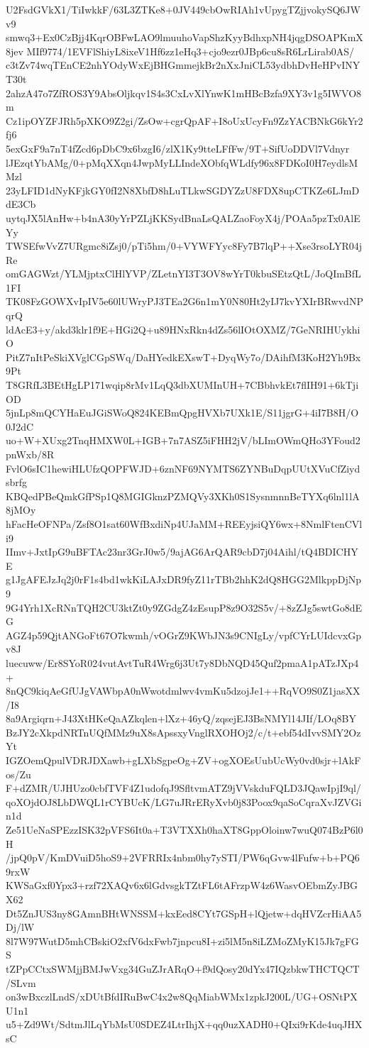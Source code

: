 U2FsdGVkX1/TiIwkkF/63L3ZTKe8+0JV449cbOwRIAh1vUpygTZjjvokySQ6JWv9
smwq3+Ex0CzBjj4KqrOBFwLAO9lmuuhoVapShzKyyBdhxpNH4jqgDSOAPKmX8jev
MIf9774/1EVFlShiyL8ixeV1Hf6zz1eHq3+cjo9ezr0JBp6cu8sR6LrLirab0AS/
c3tZv74wqTEnCE2nhYOdyWxEjBHGmmejkBr2nXxJniCL53ydbhDvHeHPvINYT30t
2ahzA47o7ZfROS3Y9AbsOljkqv1S4s3CxLvXlYnwK1mHBcBzfa9XY3v1g5IWVO8m
Cz1ipOYZFJRh5pXKO9Z2gi/ZsOw+cgrQpAF+I8oUxUcyFn9ZzYACBNkG6kYr2fj6
5exGxF9a7nT4fZcd6pDbC9x6bzgI6/zlX1Ky9tteLFfFw/9T+SifUoDDVl7Vdnyr
lJEzqtYbAMg/0+pMqXXqn4JwpMyLLIndeXObfqWLdfy96x8FDKoI0H7eydlsMMzl
23yLFID1dNyKFjkGY0fI2N8XbfD8hLuTLkwSGDYZzU8FDX8upCTKZe6LJmDdE3Cb
uytqJX5lAnHw+b4nA30yYrPZLjKKSydBnaLsQALZaoFoyX4j/POAa5pzTx0AlEYy
TWSEfwVvZ7URgmc8iZsj0/pTi5hm/0+VYWFYyc8Fy7B7lqP++Xse3rsoLYR04jRe
omGAGWzt/YLMjptxClHlYVP/ZLetnYI3T3OV8wYrT0kbuSEtzQtL/JoQImBfL1FI
TK08FzGOWXvIpIV5e60lUWryPJ3TEa2G6n1mY0N80Ht2yIJ7kvYXIrBRwvdNPqrQ
ldAcE3+y/akd3klr1f9E+HGi2Q+u89HNxRkn4dZs56lIOtOXMZ/7GeNRIHUykhiO
PitZ7nItPeSkiXVglCGpSWq/DaHYedkEXswT+DyqWy7o/DAihfM3KoH2Yh9Bx9Pt
T8GRfL3BEtHgLP171wqip8rMv1LqQ3dbXUMInUH+7CBbhvkEt7flIH91+6kTjiOD
5jnLp8mQCYHaEuJGiSWoQ824KEBmQpgHVXb7UXk1E/S11jgrG+4iI7B8H/O0J2dC
uo+W+XUxg2TnqHMXW0L+IGB+7n7ASZ5iFHH2jV/bLImOWmQHo3YFoud2pnWxb/8R
FvlO6sIC1hewiHLUfzQOPFWJD+6znNF69NYMTS6ZYNBuDqpUUtXVuCfZiydsbrfg
KBQedPBeQmkGfPSp1Q8MGIGknzPZMQVy3XKh0S1SysnmnnBeTYXq6lnl1lA8jMOy
hFacHeOFNPa/Zsf8O1sat60WfBxdiNp4UJaMM+REEyjsiQY6wx+8NmlFtenCVli9
IImv+JxtIpG9uBFTAc23nr3GrJ0w5/9ajAG6ArQAR9cbD7j04Aihl/tQ4BDICHYE
g1JgAFEJzJq2j0rF1s4bd1wkKiLAJxDR9fyZ11rTBb2hhK2dQ8HGG2MlkppDjNp9
9G4Yrh1XcRNnTQH2CU3ktZt0y9ZGdgZ4zEsupP8z9O32S5v/+8zZJg5swtGo8dEG
AGZ4p59QjtANGoFt67O7kwmh/vOGrZ9KWbJN3s9CNIgLy/vpfCYrLUIdcvxGpv8J
luecuww/Er8SYoR024vutAvtTuR4Wrg6j3Ut7y8DbNQD45Quf2pmaA1pATzJXp4+
8nQC9kiqAeGfUJgVAWbpA0nWwotdmlwv4vmKu5dzojJe1++RqVO9S0Z1jasXX/I8
8a9Argiqrn+J43XtHKeQaAZkqlen+lXz+46yQ/zqsejEJ3BsNMYl14JIf/LOq8BY
BzJY2cXkpdNRTnUQfMMz9uX8sApssxyVnglRXOHOj2/c/t+ebf54dIvvSMY2OzYt
IGZOemQpulVDRJDXawb+gLXbSgpeOg+ZV+ogXOEsUubUcWy0vd0sjr+lAkFos/Zu
F+dZMR/UJHUzo0cbfTVF4Z1udofqJ9SfltvmATZ9jVVskduFQLD3JQawIpjI9ql/
qoXOjdOJ8LbDWQL1rCYBUcK/LG7uJRrERyXvb0j83Poox9qaSoCqraXvJZVGin1d
Ze51UeNaSPEzzISK32pVFS6It0a+T3VTXXh0haXT8GppOloinw7wuQ074BzP6l0H
/jpQ0pV/KmDVuiD5hoS9+2VFRRIx4nbm0hy7ySTI/PW6qGvw4lFufw+b+PQ69rxW
KWSaGxf0Ypx3+rzf72XAQv6x6lGdvsgkTZtFL6tAFrzpW4z6WasvOEbmZyJBGX62
Dt5ZnJUS3ny8GAmnBHtWNSSM+kxEed8CYt7GSpH+lQjetw+dqHVZcrHiAA5Dj/lW
8l7W97WutD5mhCBskiO2xfV6dxFwb7jnpcu8I+zi5lM5n8iLZMoZMyK15Jk7gFGS
tZPpCCtxSWMjjBMJwVxg34GuZJrARqO+f9dQosy20dYx47IQzbkwTHCTQCT/SLvm
on3wBxczlLndS/xDUtBfdIRuBwC4x2w8QqMiabWMx1zpkJ200L/UG+OSNtPXU1n1
u5+Zd9Wt/SdtmJlLqYbMsU0SDEZ4LtrIhjX+qq0uzXADH0+QIxi9rKde4uqJHXsC

